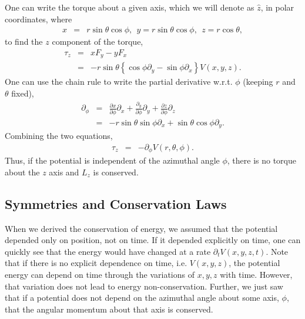 One can write the torque about a given axis, which we will denote as $\hat{z}$, in polar coordinates, where
\begin{eqnarray}
x&=&r\sin\theta\cos\phi,~~y=r\sin\theta\cos\phi,~~z=r\cos\theta,
\end{eqnarray}
to find the $z$ component of the torque,
\begin{eqnarray}
\tau_z&=&xF_y-yF_x\\
\nonumber
&=&-r\sin\theta\left\{\cos\phi \partial_y-\sin\phi \partial_x\right\}V(x,y,z).
\end{eqnarray}
One can use the chain rule to write the partial derivative w.r.t. $\phi$ (keeping $r$ and $\theta$ fixed),
\begin{eqnarray}
\partial_\phi&=&\frac{\partial x}{\partial\phi}\partial_x+\frac{\partial_y}{\partial\phi}\partial_y
+\frac{\partial z}{\partial\phi}\partial_z\\
\nonumber
&=&-r\sin\theta\sin\phi\partial_x+\sin\theta\cos\phi\partial_y.
\end{eqnarray}
Combining the two equations,
\begin{eqnarray}
\tau_z&=&-\partial_\phi V(r,\theta,\phi).
\end{eqnarray}
Thus, if the potential is independent of the azimuthal angle $\phi$, there is no torque about the $z$ axis and $L_z$ is conserved.

\subsection{Symmetries and Conservation Laws}

When we derived the conservation of energy, we assumed that the potential depended only on position, not on time. If it depended explicitly on time, one can quickly see that the energy would have changed at a rate $\partial_tV(x,y,z,t)$. Note that if there is no explicit dependence on time, i.e. $V(x,y,z)$, the potential energy can depend on time through the variations of $x,y,z$ with time. However, that variation does not lead to energy non-conservation. Further, we just saw that if a potential does not depend on the azimuthal angle about some axis, $\phi$, that the angular momentum about that axis is conserved.

